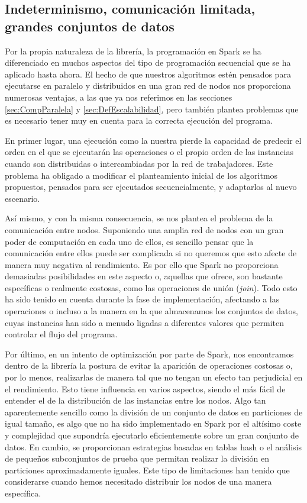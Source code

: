 \subsection{Indeterminismo, comunicación limitada, grandes conjuntos de datos}

Por la propia naturaleza de la librería, la programación en Spark se ha diferenciado en muchos aspectos del tipo de programación secuencial que se ha aplicado hasta ahora. El hecho de que nuestros algoritmos estén pensados para ejecutarse en paralelo y distribuidos en una gran red de nodos nos proporciona numerosas ventajas, a las que ya nos referimos en las secciones \ref{sec:CompParalela} y \ref{sec:DefEscalabilidad}, pero también plantea problemas que es necesario tener muy en cuenta para la correcta ejecución del programa.

En primer lugar, una ejecución como la nuestra pierde la capacidad de predecir el orden en el que se ejecutarán las operaciones o el propio orden de las instancias cuando son distribuidas o intercambiadas por la red de trabajadores. Este problema ha obligado a modificar el planteamiento inicial de los algoritmos propuestos, pensados para ser ejecutados secuencialmente, y adaptarlos al nuevo escenario.

Así mismo, y con la misma consecuencia, se nos plantea el problema de la comunicación entre nodos. Suponiendo una amplia red de nodos con un gran poder de computación en cada uno de ellos, es sencillo pensar que la comunicación entre ellos puede ser complicada si no queremos que esto afecte de manera muy negativa al rendimiento. Es por ello que Spark no proporciona demasiadas posibilidades en este aspecto o, aquellas que ofrece, son bastante específicas o realmente costosas, como las operaciones de unión (\textit{join}). Todo esto ha sido tenido en cuenta durante la fase de implementación, afectando a las operaciones o incluso a la manera en la que almacenamos los conjuntos de datos, cuyas instancias han sido a menudo ligadas a diferentes valores que permiten controlar el flujo del programa.

Por último, en un intento de optimización por parte de Spark, nos encontramos dentro de la librería la postura de evitar la aparición de operaciones costosas o, por lo menos, realizarlas de manera tal que no tengan un efecto tan perjudicial en el rendimiento. Esto tiene influencia en varios aspectos, siendo el más fácil de entender el de la distribución de las instancias entre los nodos. Algo tan aparentemente sencillo como la división de un conjunto de datos en particiones de igual tamaño, es algo que no ha sido implementado en Spark por el altísimo coste y complejidad que supondría ejecutarlo eficientemente sobre un gran conjunto de datos. En cambio, se proporcionan estrategias basadas en tablas hash o el análisis de pequeños subconjuntos de prueba que permitan realizar la división en particiones aproximadamente iguales. Este tipo de limitaciones han tenido que considerarse cuando hemos necesitado distribuir los nodos de una manera específica.

